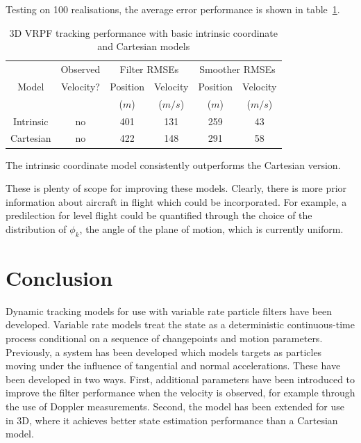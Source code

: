 \documentclass[conference]{IEEEtran}
\begin{document}
Testing on 100 realisations, the average error performance is shown in table~\ref{tab:3D_performance}.
%
\begin{table}
\renewcommand{\arraystretch}{1.3}
\caption{3D VRPF tracking performance with basic intrinsic coordinate and Cartesian models}
\label{tab:3D_performance}
\centering
\begin{tabular}{|c|c|c|c|c|c|}
\hline
      & Observed  & \multicolumn{2}{c|}{Filter RMSEs}  & \multicolumn{2}{c|}{Smoother RMSEs}  \\
Model & Velocity? & Position & Velocity                & Position & Velocity                  \\
      &           & ($m$)    & ($m/s$)                 & ($m$)    & ($m/s$)                   \\
\hline
Intrinsic & no  & 401 & 131 & 259 & 43 \\
\hline
Cartesian & no  & 422 & 148 & 291 & 58 \\
\hline
\end{tabular}
\end{table}

The intrinsic coordinate model consistently outperforms the Cartesian version.

These is plenty of scope for improving these models. Clearly, there is more prior information about aircraft in flight which could be incorporated. For example, a predilection for level flight could be quantified through the choice of the distribution of $\phi_k$, the angle of the plane of motion, which is currently uniform.



\section{Conclusion}

Dynamic tracking models for use with variable rate particle filters have been developed. Variable rate models treat the state as a deterministic continuous-time process conditional on a sequence of changepoints and motion parameters. Previously, a system has been developed which models targets as particles moving under the influence of tangential and normal accelerations. These have been developed in two ways. First, additional parameters have been introduced to improve the filter performance when the velocity is observed, for example through the use of Doppler measurements. Second, the model has been extended for use in 3D, where it achieves better state estimation performance than a Cartesian model.





\end{document}
